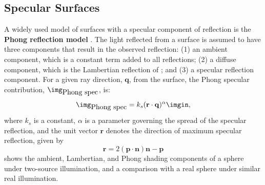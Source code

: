 
\subsection{Specular Surfaces}



A widely used model of surfaces with a specular component of reflection is the {\bf Phong reflection model} \cite{Phong1975}.  The light reflected from a surface is assumed to have three components that result in the observed reflection:  (1) an ambient component, which is a constant term added to all reflections; (2) a diffuse component, which is the Lambertian reflection of \eqn{\ref{eq:Lambert}}; and (3) a specular reflection component. For a given ray direction, $\mathbf{q}$, from the surface, the Phong specular contribution, $\img_{\mbox{Phong spec}}$, is:
\begin{equation}
\img_{\mbox{Phong spec}} = k_s (\mathbf{r} \cdot \mathbf{q})^\alpha \imgin,
\end{equation}
where $k_s$ is a constant, $\alpha$ is a parameter governing the spread of the specular reflection, and the unit vector $\mathbf{r}$ denotes the direction of maximum specular reflection, given by
\begin{equation}
\mathbf{r} = 2(\mathbf{p} \cdot \mathbf{n}) \mathbf{n} - \mathbf{p}
\end{equation}
\Fig{\ref{fig:rendering}} shows the ambient, Lambertian, and Phong shading components of a sphere under two-source illumination, and a comparison with a real sphere under similar real illumination.


